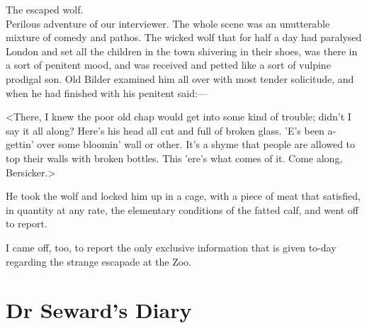 \begin{newspaper}{The escaped wolf.\\Perilous adventure of our interviewer.}
The whole scene was an unutterable mixture of comedy and pathos. The wicked wolf that for half a day had paralysed London and set all the children in the town shivering in their shoes, was there in a sort of penitent mood, and was received and petted like a sort of vulpine prodigal son. Old Bilder examined him all over with most tender solicitude, and when he had finished with his penitent said:—

<There, I knew the poor old chap would get into some kind of trouble; didn't I say it all along? Here's his head all cut and full of broken glass. 'E's been a-gettin' over some bloomin' wall or other. It's a shyme that people are allowed to top their walls with broken bottles. This 'ere's what comes of it. Come along, Bersicker.>

He took the wolf and locked him up in a cage, with a piece of meat that satisfied, in quantity at any rate, the elementary conditions of the fatted calf, and went off to report.

I came off, too, to report the only exclusive information that is given to-day regarding the strange escapade at the Zoo.
\end{newspaper}

\section{Dr Seward's Diary}

